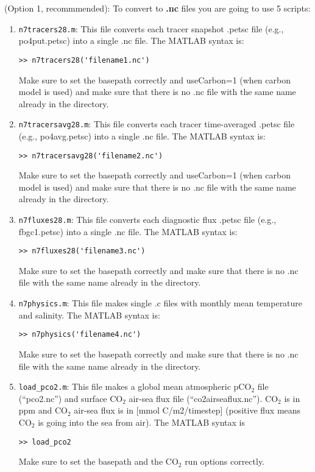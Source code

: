 \documentclass[a4paper]{article}
\def\noin{\noindent }
\begin{document}
\vspace{5mm}
\noin (Option 1, recommmended): To convert to \textbf{.nc} files you are going to use 5 scripts:
\begin{enumerate}
\item \verb|n7tracers28.m|: This file converts each tracer snapshot .petsc file (e.g., po4put.petsc) into a single .nc file. The MATLAB syntax is:
\begin{lstlisting}[style=DOS]
 >> n7tracers28('filename1.nc')
\end{lstlisting}
Make sure to set the basepath correctly and useCarbon=1 (when carbon model is used) and make sure that there is no .nc file with the same name already in the directory.

\item\verb|n7tracersavg28.m|: This file converts each tracer time-averaged .petsc file (e.g., po4avg.petsc) into a single .nc file. The MATLAB syntax is:
\begin{lstlisting}[style=DOS]
 >> n7tracersavg28('filename2.nc')
\end{lstlisting}
Make sure to set the basepath correctly and useCarbon=1 (when carbon model is used) and make sure that there is no .nc file with the same name already in the directory.

\item\verb|n7fluxes28.m|: This file converts each diagnostic flux .petsc file (e.g., fbgc1.petsc) into a single .nc file. The MATLAB syntax is:
\begin{lstlisting}[style=DOS]
 >> n7fluxes28('filename3.nc')
\end{lstlisting}
Make sure to set the basepath correctly and make sure that there is no .nc file with the same name already in the directory.

\item\verb|n7physics.m|: This file makes single .c files with monthly mean temperature and salinity. The MATLAB syntax is:
\begin{lstlisting}[style=DOS]
 >> n7physics('filename4.nc')
\end{lstlisting}
Make sure to set the basepath correctly and make sure that there is no .nc file with the same name already in the directory.

\item\verb|load_pco2.m|: This file makes a global mean atmospheric $\mathrm{pCO_{2}}$ file (``pco2.nc'') and surface $\mathrm{CO_{2}}$ air-sea flux file (``co2airseaflux.nc''). $\mathrm{CO_{2}}$ is in ppm and $\mathrm{CO_{2}}$ air-sea flux is in [mmol C/m2/timestep] (positive flux means $\mathrm{CO_{2}}$ is going into the sea from air). The MATLAB syntax is 
\begin{lstlisting}[style=DOS]
 >> load_pco2
\end{lstlisting}
Make sure to set the basepath and the $\mathrm{CO_{2}}$ run options correctly.


\end{enumerate}
\end{document}
